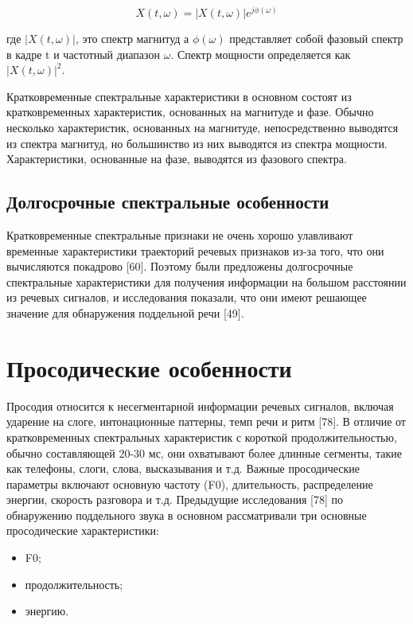 \begin{equation}
    X(t, \omega) = |X(t, \omega)| e^{j\phi(\omega)}
\end{equation}

где \(|X(t, \omega)|\), это спектр магнитуд а \(\phi(\omega)\) представляет собой фазовый спектр в кадре t и частотный диапазон \(\omega\). Спектр мощности определяется как \(|X(t, \omega)|^2\).

Кратковременные спектральные характеристики в основном состоят из кратковременных характеристик, основанных на магнитуде и фазе. Обычно несколько характеристик, основанных на магнитуде, непосредственно выводятся из спектра магнитуд, но большинство из них выводятся из спектра мощности. Характеристики, основанные на фазе, выводятся из фазового спектра.

\subsection{Долгосрочные спектральные особенности}

Кратковременные спектральные признаки не очень хорошо улавливают временные характеристики траекторий речевых признаков из-за того, что они вычисляются покадрово [60]. Поэтому были предложены долгосрочные спектральные характеристики для получения информации на большом расстоянии из речевых сигналов, и исследования показали, что они имеют решающее значение для обнаружения поддельной речи [49].


\section{Просодические особенности}

Просодия относится к несегментарной информации речевых сигналов, включая ударение на слоге, интонационные паттерны, темп речи и ритм [78]. В отличие от кратковременных спектральных характеристик с короткой продолжительностью, обычно составляющей 20-30 мс, они охватывают более длинные сегменты, такие как телефоны, слоги, слова, высказывания и т.д. Важные просодические параметры включают основную частоту (F0), длительность, распределение энергии, скорость разговора и т.д. Предыдущие исследования [78] по обнаружению поддельного звука в основном рассматривали три основные просодические характеристики:

\begin{itemize}
    \item F0;
    \item продолжительность;
    \item энергию.
\end{itemize}

